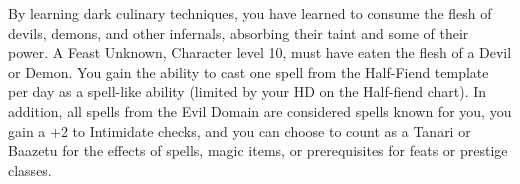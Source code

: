 \shortdescfeat
{By learning dark culinary techniques, you have learned to consume the flesh of devils, demons, and other infernals, absorbing their taint and some of their power.}
{A Feast Unknown, Character level 10, must have eaten the flesh of a Devil or Demon.}
{You gain the ability to cast one spell from the Half-Fiend template per day as a spell-like ability (limited by your HD on the Half-fiend chart). In addition, all spells from the Evil Domain are considered spells known for you, you gain a +2 to Intimidate checks, and you can choose to count as a Tanari or Baazetu for the effects of spells, magic items, or prerequisites for feats or prestige classes.}

